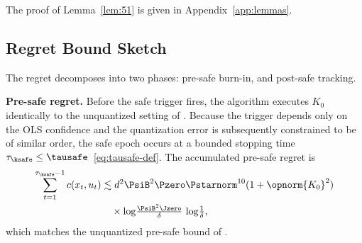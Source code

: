\documentclass[11pt,journal,onecolumn]{IEEEtran}
\begin{document}
The proof of Lemma~\ref{lem:51} is given in Appendix~\ref{app:lemmas}.


\subsection{Regret Bound Sketch}
\label{sec:regret-sketch}

The regret decomposes into two phases: pre-safe burn-in, and post-safe tracking.

\textbf{Pre-safe regret.} Before the safe trigger fires, the algorithm executes $K_0$ identically to the unquantized setting of \cite{simchowitz20a}. Because the trigger depends only on the OLS confidence and the quantization error is subsequently constrained to be of similar order, the safe epoch occurs at a bounded stopping time $\tau_{\ksafe} \le \tausafe$~\eqref{eq:tausafe-def}. The accumulated pre-safe regret is
\begin{equation}\label{eq:presafe-regret}
    \begin{split}
        \sum_{t=1}^{\tau_{\ksafe}-1} c(x_t,u_t) &\lesssim d^2 \PsiB^2 \Pzero \Pstarnorm^{10} (1+\opnorm{K_0}^2) \\
        &\quad \times \log\!\tfrac{\PsiB^2 \Jzero}{\delta}\, \log\!\tfrac{1}{\delta},
    \end{split}
\end{equation}
which matches the unquantized pre-safe bound of \cite[Lem. 5.5]{simchowitz20a}.
\end{document}

